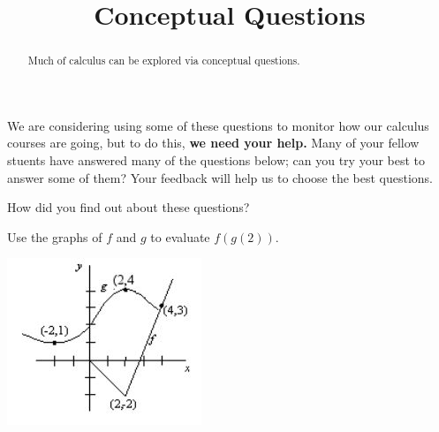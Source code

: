 \documentclass{ximera}
\title{Conceptual Questions}
\newcommand{\recommendation}[1]{}
\newcommand{\PCA}[1]{}
\begin{document}
\begin{abstract}
  Much of calculus can be explored via conceptual questions.
\end{abstract}
\maketitle

We are considering using some of these questions to monitor how our
calculus courses are going, but to do this, \textbf{we need your
  help.}  Many of your fellow stuents have answered many of the
questions below; can you try your best to answer some of them?  Your
feedback will help us to choose the best questions.

\begin{question}
How did you find out about these questions?
\begin{freeResponse}
\end{freeResponse}
\end{question}




\begin{problem}
  \recommendation{Elizabeth}
  \PCA{\#5}
  Use the graphs of $f$ and $g$ to evaluate $f(g(2))$.
  \begin{image}
    \includegraphics[scale = 1]{fg2.jpg}
  \end{image}
  \begin{multipleChoice}
  \end{multipleChoice}
\end{problem}
  
\end{document}
